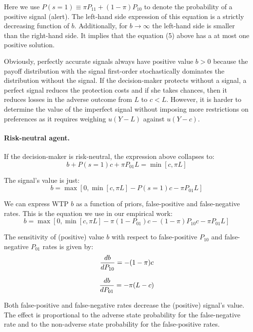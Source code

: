 \documentclass[12pt,a4paper]{article}
\begin{document}
Here we use $P(s=1)\equiv \pi P_{11}+(1-\pi)P_{10}$ to denote the probability of a positive signal (alert). The left-hand side expression of this equation is a strictly decreasing function of $b$. Additionally, for $b\rightarrow \infty$ the left-hand side is smaller than the right-hand side. It implies that the equation (5) above has a at most one positive solution.

Obviously, perfectly accurate signals always have positive value $b>0$ because the payoff distribution with the signal first-order stochastically dominates the distribution without the signal. If the decision-maker protects without a signal, a perfect signal reduces the protection costs and if she takes chances, then it reduces losses in the adverse outcome from $L$ to $c<L$.  However, it is harder to determine the value of the imperfect signal without imposing more restrictions on preferences as it requires weighing $u(Y-L)$ against $u(Y-c)$.


\paragraph{Risk-neutral agent.} If the decision-maker is risk-neutral, the expression above collapses to:
$$b+P(s=1)c+\pi P_{01}L=\min[c,\pi L]$$

The signal's value is just:
\begin{equation}
b=\max[0,\min[c,\pi L]-P(s=1)c-\pi P_{01}L]
\end{equation}

We can express WTP $b$ as a function of priors, false-positive and false-negative rates. This is the equation we use in our empirical work:
\begin{equation}
b=\max[0,\min[c,\pi L]-\pi (1-P_{01})c-(1-\pi)P_{10}c-\pi P_{01}L]
\end{equation}\label{eq:rnWTP}

The sensitivity of (positive) value $b$ with respect to false-positive $P_{10}$ and false-negative $P_{01}$ rates is given by:
\begin{equation}
{db\over dP_{10}}=-(1-\pi)c
\end{equation}

\begin{equation}
{db\over dP_{01}}=-\pi(L-c)
\end{equation}
\vspace{10pt}

Both false-positive and false-negative rates decrease the (positive) signal's value. The effect is proportional to the adverse state probability for the false-negative rate and to the non-adverse state probability for the false-positive rates.
\end{document}
